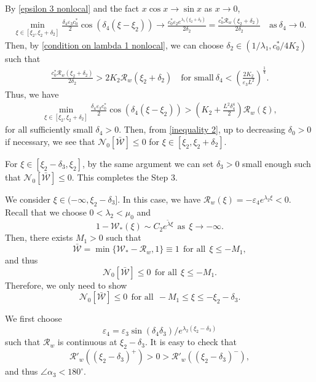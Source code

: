 \documentclass[11pt,a4paper]{article}
\numberwithin{equation}{section}
\numberwithin{figure}{section}
\newcommand\beaa{\begin{eqnarray*}}
\newcommand\eeaa{\end{eqnarray*}}
\begin{document}
By \eqref{epsilon 3 nonlocal} and the fact $x\cos x\to\sin x$ as $x\to 0$,
\beaa
\min_{\xi\in[\xi_2,\xi_2+\delta_2]}\frac{\delta_4\varepsilon_3c_0^*}{2}\cos(\delta_4(\xi-\xi_2))\to\frac{c_0^*\varepsilon_2e^{\lambda_1(\xi_2+\delta_2)}}{2\delta_2}
=\frac{c^*_0\mathcal{R}_w(\xi_2+\delta_2)}{2\delta_2}
\quad\text{as}\ \delta_4\to0.
\eeaa
Then, by \eqref{condition on lambda 1 nonlocal}, we can choose
$\delta_2\in(1/\lambda_1,c_0^*/4K_2)$ such that
\beaa
\frac{c^*_0\mathcal{R}_w(\xi_2+\delta_2)}{2\delta_2}>2 K_2\mathcal{R}_w(\xi_2+\delta_2)
\quad\text{for small}\ \delta_4<(\frac{2K_2}{\varepsilon_3L^2})^{\frac{1}{4}}.
\eeaa
Thus, we have
\beaa%
\min_{\xi\in[\xi_2,\xi_2+\delta_2]}\frac{\delta_4\varepsilon_3c_0^*}{2}\cos(\delta_4(\xi-\xi_2))>(K_2+\frac{L^2\delta_4^4}{2})\mathcal{R}_w(\xi),
\eeaa
for all sufficiently small $\delta_4>0$.
Then, from \eqref{inequality 2}, up to decreasing $\delta_0>0$ if necessary, %
we see that $\mathcal{N}_0[\bar{\mathcal W}]\le 0$ for $\xi\in[\xi_2,\xi_2+\delta_2]$.

For $\xi\in[\xi_2-\delta_3,\xi_2]$, by the same argument
we can set $\delta_3>0$ small enough such that
$\mathcal{N}_0[\bar{\mathcal W}]\le 0$. This completes the Step 3.

\medskip

 We consider $\xi\in(-\infty,\xi_2-\delta_3]$. In this case, we have $\mathcal{R}_w(\xi)=-\varepsilon_4e^{\lambda_2\xi}<0$.
Recall that we choose $0<\lambda_2<\mu_0$
and 
$$1-\mathcal{W}_*(\xi)\sim C_2 e^{\tilde\lambda\xi}\ \ \text{as}\ \ \xi\to-\infty.$$
Then, there exists $M_1>0$ such that 
$$\bar{\mathcal W}=\min\{\mathcal{W}_*-\mathcal{R}_w,1\}\equiv 1\ \ \text{for all}\ \ \xi\le -M_1,$$
and thus 
$$\mathcal{N}_0[\bar{\mathcal W}]\le 0\  \ \text{for all}\ \ \xi\le -M_1.$$ Therefore, we only need to show 
$$\mathcal{N}_0[\bar{\mathcal W}]\le 0\ \  \text{for all}\ \ -M_1\le\xi\le -\xi_2-\delta_3.$$

We first choose 
$$\varepsilon_4=\varepsilon_3\sin(\delta_4\delta_3)/e^{\lambda_2(\xi_2-\delta_3)}$$
such that $\mathcal{R}_w$ is continuous at $\xi_2-\delta_3$. It is easy to check that 
$$\mathcal{R}'_w((\xi_2-\delta_3)^+)>0>\mathcal{R}'_w((\xi_2-\delta_3)^-),$$
 and thus $\angle\alpha_3< 180^{\circ}$.
\end{document}
